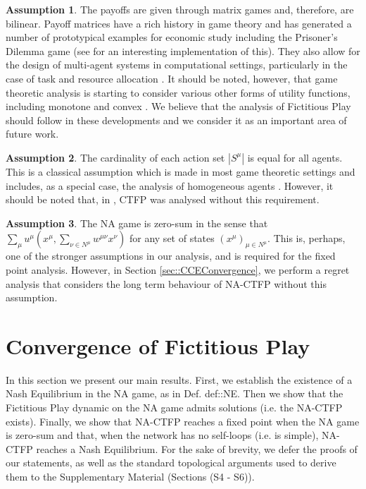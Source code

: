 \documentclass{article}
\theoremstyle{definition}
\newtheorem{assumption}{Assumption}
\newcommand{\actionset}[1]{S^{#1}}
\newcommand{\wmunu}{w^{\mu \nu}}
\newcommand{\xmu}{x^{\mu}}
\newcommand{\xnu}{x^{\nu}}
\newcommand{\weightedsum}{ \sum_{\nu \in N^\mu} \wmunu \xnu}
\begin{document}
  \begin{assumption}\label{ass::matrixgame}
    The payoffs are given through matrix games and, therefore, are bilinear. Payoff matrices
    have a rich history in game theory and has generated a number of prototypical examples for
    economic study including the Prisoner's Dilemma game (see \cite{Axelrod} for an interesting
    implementation of this). They also allow for the design of multi-agent systems in
    computational settings, particularly in the case of task and resource allocation \cite{AGT
    and some of the Applied Game Theory Papers}. It should be noted, however, that game
    theoretic analysis is starting to consider various other forms of utility functions,
    including monotone \cite{Maryam} and convex \cite{Parise}. We believe that the analysis of
    Fictitious Play should follow in these developments and we consider it as an important area
    of future work.
  \end{assumption}

  \begin{assumption}\label{ass::sameactions}
    The cardinality of each action set $|\actionset{\mu}|$ is equal for all agents. This is
    a classical assumption which is made in most game theoretic settings and includes, as a
    special case, the analysis of homogeneous agents \cite{}. However, it should be noted that,
    in \cite{Ewerhart}, CTFP was analysed without this requirement.  
  \end{assumption}

  \begin{assumption}\label{ass::zerosum}
    The NA game is zero-sum in the sense that $\sum_{\mu} u^\mu(\xmu, \weightedsum)$ for any set
    of states $(x^\mu)_{\mu \in N^\mu}$. This is, perhaps, one of the stronger assumptions in
    our analysis, and is required for the fixed point analysis. However, in Section
    \ref{sec::CCEConvergence}, we perform a regret analysis that considers the long term
    behaviour of NA-CTFP without this assumption.
  \end{assumption}

\section{Convergence of Fictitious Play}

  
  In this section we present our main results. First, we establish the existence of a Nash Equilibrium in the NA game, as in Def. \refname{def::NE}. Then we show that the Fictitious Play dynamic on the NA game admits solutions (i.e. the NA-CTFP exists). Finally, we show that NA-CTFP reaches a fixed point when the NA game is zero-sum and that, when the network has no self-loops (i.e. is simple), NA-CTFP reaches a Nash Equilibrium. For the sake of brevity, we defer the proofs of our statements, as well as the standard topological arguments used to derive them to the Supplementary Material (Sections (S4 - S6)).
\end{document}
